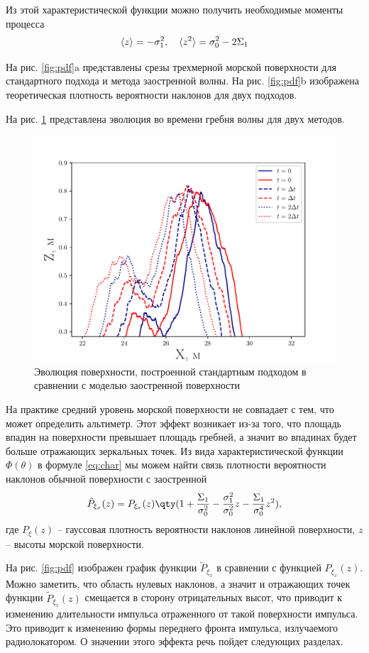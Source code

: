 Из этой характеристической функции можно получить необходимые моменты процесса
\begin{equation}
    \langle z\rangle = - \sigma_1^2, \quad \langle z^2\rangle = \sigma_0^2 - 2 \Sigma_1
\end{equation}
 
На рис. \ref{fig:pdf}a представлены срезы трехмерной морской поверхности 
для стандартного подхода и метода заостренной волны. На рис. \ref{fig:pdf}b
изображена теоретическая плотность вероятности наклонов для двух подходов. 

На рис. \ref{fig:evolution} представлена эволюция во времени гребня волны для
двух методов. 

\begin{figure}[h!]
    \centering
    \includegraphics[width=0.8\linewidth]{fig/evolution}
    \caption{Эволюция поверхности, построенной стандартным подходом в сравнении
    с моделью заостренной поверхности}
    \label{fig:evolution}
\end{figure}



На практике средний уровень морской поверхности не совпадает с тем, что может
определить альтиметр. Этот эффект возникает из-за того, что площадь впадин на
поверхности превышает площадь гребней, а значит во впадинах будет больше
отражающих зеркальных точек. 
Из вида характеристической функции $\Phi(\theta)$ в формуле  \eqref{eq:char} мы
можем найти связь плотности вероятности наклонов обычной поверхности с
заостренной
\begin{equation}
    \tilde P_{\xi_x}(z) = 
    P_{\xi_x}(z)\qty(1 + 
                    \frac{\Sigma_1}{\sigma_0^2} -
                    \frac{\sigma_1^2}{\sigma_0^2} z -
                    \frac{\Sigma_1}{\sigma_0^4}z^2), 
\end{equation}
где $P_\xi(z)$ -- гауссовая плотность вероятности наклонов линейной
поверхности,  $z$ -- высоты морской поверхности.


На рис. \ref{fig:pdf} изображен график функции $\tilde P_{\xi_x}$ в сравнении с
функцией $P_{\xi_x}(z)$. Можно заметить, что область нулевых наклонов, а значит
и отражающих точек функции $\tilde P_{\xi_x}(z)$ смещается в сторону
отрицательных высот, что приводит к изменению длительности импульса отраженного
от такой поверхности импульса. 
Это приводит к изменению формы переднего фронта импульса, излучаемого
радиолокатором. О значении этого эффекта речь пойдет следующих разделах.

